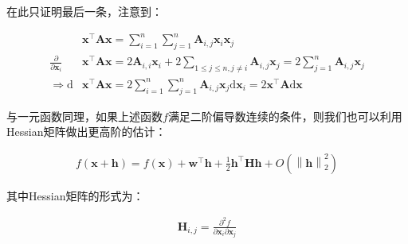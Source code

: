 \documentclass[UTF8]{book}
\begin{document}
在此只证明最后一条，注意到：
\begin{large}
    \begin{equation}
        \begin{aligned}
            &\mathbf{x}^\top \mathbf{A} \mathbf{x}=\sum_{i=1}^{n}\sum_{j=1}^{n}\mathbf{A}_{i,j}\mathbf{x}_i\mathbf{x}_j \\
            \frac{\partial}{\partial \mathbf{x}_i}&\mathbf{x}^\top \mathbf{A} \mathbf{x}=2\mathbf{A}_{i,i}\mathbf{x}_i+2\sum_{1 \le j \le n, j\not = i}{\mathbf{A}_{i,j}\mathbf{x}_j}=2\sum_{j=1}^{n}\mathbf{A}_{i,j}\mathbf{x}_j \\
            \Rightarrow \mathrm{d}&\mathbf{x}^\top \mathbf{A} \mathbf{x}=2\sum_{i=1}^{n}{\sum_{j=1}^{n}\mathbf{A}_{i,j}\mathbf{x}_j\mathrm{d}\mathbf{x}_i}=2\mathbf{x}^\top \mathbf{A}\mathrm{d}\mathbf{x}
            \nonumber
        \end{aligned}
    \end{equation}
\end{large}
与一元函数同理，如果上述函数$f$满足二阶偏导数连续的条件，则我们也可以利用Hessian矩阵做出更高阶的估计：
\begin{large}
    \begin{equation}
        \begin{aligned}
            f(\mathbf{x}+\mathbf{h})=f(\mathbf{x})+\mathbf{w}^\top \mathbf{h}+\frac{1}{2}\mathbf{h}^\top \mathbf{H}\mathbf{h}+O(\left \| \mathbf{h} \right \|_2^2)
            \nonumber
        \end{aligned}
    \end{equation}
\end{large}
其中Hessian矩阵的形式为：
\begin{large}
    \begin{equation}
        \begin{aligned}
            \mathbf{H}_{i,j}=\frac{\partial^2f}{\partial\mathbf{x}_i\partial\mathbf{x}_j}
            \nonumber
        \end{aligned}
    \end{equation}
\end{large}
        
\end{document}
